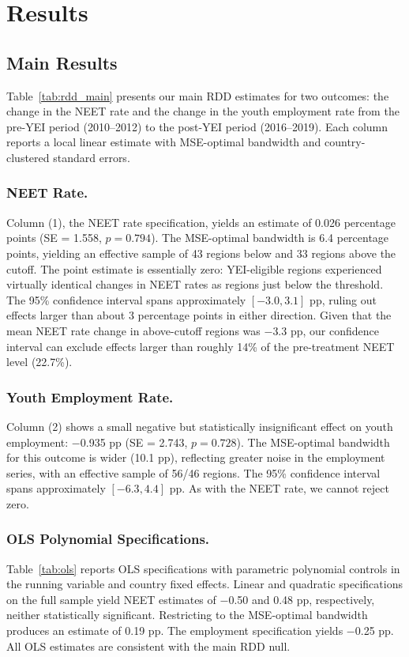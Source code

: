 \documentclass[12pt]{article}
\begin{document}
\section{Results}

\subsection{Main Results}

Table~\ref{tab:rdd_main} presents our main RDD estimates for two outcomes: the change in the NEET rate and the change in the youth employment rate from the pre-YEI period (2010--2012) to the post-YEI period (2016--2019). Each column reports a local linear estimate with MSE-optimal bandwidth and country-clustered standard errors.



\subsubsection*{NEET Rate.} Column (1), the NEET rate specification, yields an estimate of 0.026 percentage points (SE = 1.558, $p = 0.794$). The MSE-optimal bandwidth is 6.4 percentage points, yielding an effective sample of 43 regions below and 33 regions above the cutoff. The point estimate is essentially zero: YEI-eligible regions experienced virtually identical changes in NEET rates as regions just below the threshold. The 95\% confidence interval spans approximately $[-3.0, 3.1]$ pp, ruling out effects larger than about 3 percentage points in either direction. Given that the mean NEET rate change in above-cutoff regions was $-$3.3 pp, our confidence interval can exclude effects larger than roughly 14\% of the pre-treatment NEET level (22.7\%).

\subsubsection*{Youth Employment Rate.} Column (2) shows a small negative but statistically insignificant effect on youth employment: $-$0.935 pp (SE = 2.743, $p = 0.728$). The MSE-optimal bandwidth for this outcome is wider (10.1 pp), reflecting greater noise in the employment series, with an effective sample of 56/46 regions. The 95\% confidence interval spans approximately $[-6.3, 4.4]$ pp. As with the NEET rate, we cannot reject zero.

\subsubsection*{OLS Polynomial Specifications.} Table~\ref{tab:ols} reports OLS specifications with parametric polynomial controls in the running variable and country fixed effects. Linear and quadratic specifications on the full sample yield NEET estimates of $-$0.50 and 0.48 pp, respectively, neither statistically significant. Restricting to the MSE-optimal bandwidth produces an estimate of 0.19 pp. The employment specification yields $-$0.25 pp. All OLS estimates are consistent with the main RDD null.
\end{document}
